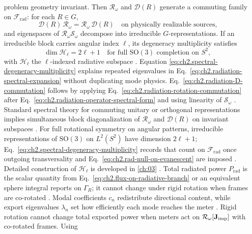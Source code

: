 problem geometry invariant. Then \(\mathcal{R}_\omega\) and \(\mathcal{D}(R)\) generate a
commuting family on \(\mathcal{F}_{\mathrm{rad}}\): for each \(R\in G\),
\begin{equation}
\label{eq:ch2.radiation-D-commutation}
\mathcal{D}(R)\,\mathcal{R}_\omega
=
\mathcal{R}_\omega\,\mathcal{D}(R)
\quad\text{on physically realizable sources,}
\end{equation}
and eigenspaces of \(\mathcal{R}_\omega\mathcal{S}_\omega\) decompose into irreducible
\(G\)-representations. If an irreducible block carries angular index \(\ell\), its
degeneracy multiplicity satisfies
\begin{equation}
\label{eq:ch2.spectral-degeneracy-multiplicity}
\dim\mathcal{H}_{\ell}
=
2\ell+1
\quad\text{for full \(\mathrm{SO}(3)\) completion on }S^{2},
\end{equation}
with \(\mathcal{H}_{\ell}\) the \(\ell\)-indexed radiative subspace
\cite{stratton1941}. Equation
\eqref{eq:ch2.spectral-degeneracy-multiplicity} explains repeated eigenvalues in
Eq.~\eqref{eq:ch2.radiation-spectral-expansion} without duplicating mode physics.
Eq.~\eqref{eq:ch2.radiation-D-commutation} follows by applying
Eq.~\eqref{eq:ch2.radiation-rotation-commutation} after
Eq.~\eqref{eq:ch2.radiation-operator-spectral-form} and using linearity of
\(\mathcal{S}_\omega\) \cite{stratton1941}. Standard spectral theory for commuting
unitary or orthogonal representations implies simultaneous block diagonalization of
\(\mathcal{R}_\omega\) and \(\mathcal{D}(R)\) on invariant subspaces
\cite{stratton1941}. For full rotational symmetry on angular patterns,
irreducible representations of \(\mathrm{SO}(3)\) on \(L^{2}(S^{2})\) have dimension
\(2\ell+1\); Eq.~\eqref{eq:ch2.spectral-degeneracy-multiplicity} records that count on
\(\mathcal{F}_{\mathrm{rad}}\) once outgoing transversality and
Eq.~\eqref{eq:ch2.rad-null-on-evanescent} are imposed \cite{jackson1999}. Detailed
construction of \(\mathcal{H}_\ell\) is developed in \ref{ch:03} \cite{harrington2001}.
Total radiated power $P_{\mathrm{rad}}$ is the scalar quantity from Eq.~\eqref{eq:ch2.flux-on-radiative-branch} or an equivalent sphere integral
reports on $\Gamma_R$; it cannot change under rigid rotation when frames are co-rotated
\cite{poynting1884}. Modal coefficients $c_n$ redistribute directional content,
while export eigenvalues $\lambda_n$ set how efficiently each mode reaches the meter
\cite{harrington2001}. Rigid rotation cannot change total exported power when meters act on
\(\mathcal{R}_\omega[\mathbf{J}_{\mathrm{imp}}]\) with co-rotated frames. Using
